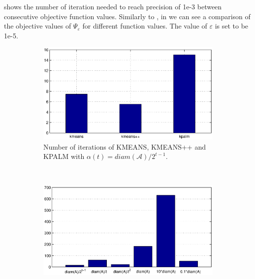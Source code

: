 \documentclass[12pt]{article}
\numberwithin{equation}{section}
\begin{document}

 shows the number of iteration needed to reach precision of 1e-3 between consecutive objective function values.
Similarly to , in  we can see a comparison of the objective values of $\Psi_{\varepsilon}$ for different function values. The value of $\varepsilon$ is set to be 1e-5.

\begin{figure}
    \centering
    \begin{subfigure}[b]{0.7\textwidth}
        \includegraphics[width=\textwidth]{iterations_algs_comparison}
        \caption{Number of iterations of KMEANS, KMEANS++ and KPALM with $\alpha(t)=diam(\mathcal{A})/2^{t-1}$.}
        \label{fig:iters_algs_comp}
    \end{subfigure}
    ~ %
    \begin{subfigure}[b]{0.7\textwidth}
        \includegraphics[width=\textwidth]{iterations_dynamic_alpha_kpalm_comparison}

\end{subfigure}
\end{figure}
\end{document}
